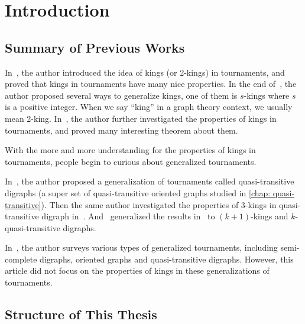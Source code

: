 \chapter{Introduction}

\section{Summary of Previous Works}

In~\cite{maurer_king_1980}, the author introduced
the idea of kings (or 2-kings) in tournaments,
and proved that kings in tournaments have many nice properties.
In the end of~\cite{maurer_king_1980},
the author proposed several ways to generalize kings,
one of them is \(s\)-kings where \(s\) is a positive integer.
When we say ``king'' in a graph theory context,
we usually mean 2-king.
In~\cite{reid_every_1982}, the author
further investigated the properties of kings in tournaments,
and proved many interesting theorem about them.

With the more and more understanding for the properties
of kings in tournaments,
people begin to curious about generalized tournaments.

In~\cite{bangjensen_quasitransitive_1995}, the author
proposed a generalization of tournaments called
quasi-transitive digraphs (a super set of
quasi-transitive oriented graphs studied in \cref{chap: quasi-transitive}).
Then the same author investigated the properties
of 3-kings in quasi-transitive digraph
in~\cite{bang-jensen_kings_1998}.
And~\cite{galeana-sanchez_existence_2013}
generalized the results in~\cite{bang-jensen_kings_1998}
to \((k+1)\)-kings and \(k\)-quasi-transitive digraphs.

In~\cite{bang-jensen_generalizations_1998},
the author surveys various types of generalized tournaments,
including semi-complete digraphs, oriented graphs and
quasi-transitive digraphs.
However, this article did not focus on the properties
of kings in these generalizations of tournaments.


\section{Structure of This Thesis}

